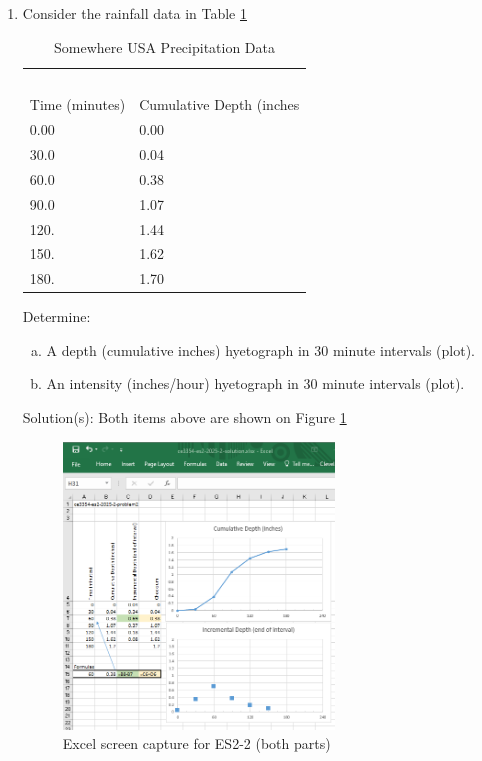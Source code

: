 \documentclass[12pt]{article}
\begin{document}
\begin{enumerate}
\begin{enumerate}[a)]
\end{enumerate}
\clearpage
\item Consider the rainfall data in Table \ref{tab:SomewhereUSARain}

\begin{table}[h!]
\centering
\caption{Somewhere USA Precipitation Data}
\begin{tabular}{p{2.0in}p{2.0in}} %
~&~\\
Time (minutes) & Cumulative Depth (inches\\
\hline
\hline
0.00 & 0.00 \\
30.0 & 0.04 \\
60.0 & 0.38 \\
90.0 & 1.07 \\
120. & 1.44 \\
150. & 1.62 \\
180. & 1.70 \\
\hline
\end{tabular}
\label{tab:SomewhereUSARain}
\end{table}

Determine:
    \begin{enumerate}[a)]
        \item A depth (cumulative inches) hyetograph in 30 minute intervals (plot). 
        \item An intensity (inches/hour) hyetograph in 30 minute intervals (plot).
    \end{enumerate}

Solution(s):
Both items above are shown on Figure \ref{fig:es2-2}

\begin{figure}[h!] %
   \centering
   \includegraphics[height=3in]{ES2-2.png} 
   \caption{Excel screen capture for ES2-2 (both parts)}
   \label{fig:es2-2}
\end{figure}


\end{enumerate}
\end{document}
